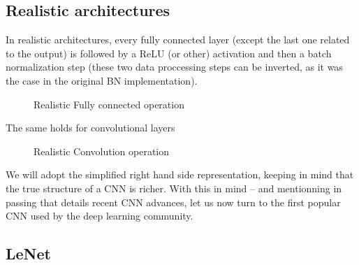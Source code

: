 \subsection{Realistic architectures}

In realistic architectures, every fully connected layer (except the last one related to the output) is followed by a ReLU (or other) activation and then a batch normalization step (these two data proccessing steps can be inverted, as it was the case in the original BN implementation).
\begin{figure}[H]
\begin{center}
\caption{Realistic Fully connected operation}
\end{center}
\end{figure}
 The same holds for convolutional layers
\begin{figure}[H]
\begin{center}
\caption{Realistic Convolution operation}
\end{center}
\end{figure}

We will adopt the simplified right hand side representation, keeping in mind that the true structure of a CNN is richer. With this in mind -- and mentionning in passing \cite{Gu2015RecentAI} that details recent CNN advances, let us now turn to the first popular CNN used by the deep learning community.

\subsection{LeNet}

